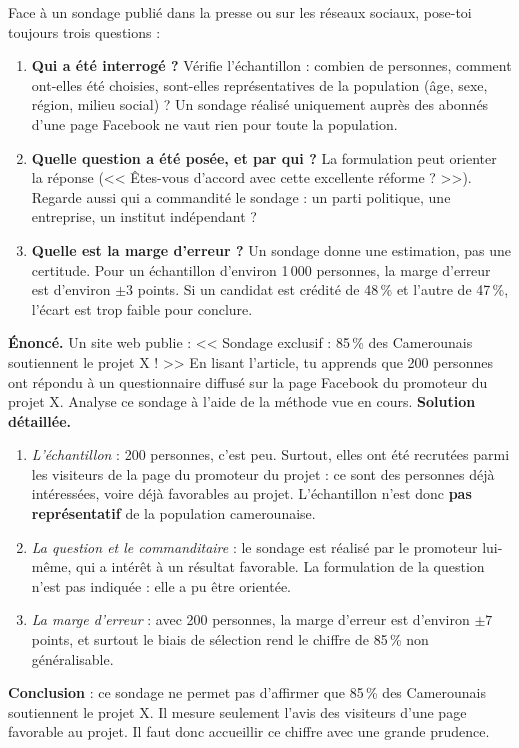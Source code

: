 \documentclass[11pt]{article}
\newcommand{\cle}[1]{{\popxbold\color{popdark}#1}}
\begin{document}
\begin{methode}
Face à un sondage publié dans la presse ou sur les réseaux sociaux, pose-toi toujours trois questions :
\begin{enumerate}
\item \textbf{Qui a été interrogé ?} Vérifie l'\cle{échantillon} : combien de personnes, comment ont-elles été choisies, sont-elles représentatives de la population (âge, sexe, région, milieu social) ? Un sondage réalisé uniquement auprès des abonnés d'une page Facebook ne vaut rien pour toute la population.
\item \textbf{Quelle question a été posée, et par qui ?} La formulation peut orienter la réponse (<< Êtes-vous d'accord avec cette excellente réforme ? >>). Regarde aussi qui a commandité le sondage : un parti politique, une entreprise, un institut indépendant ?
\item \textbf{Quelle est la marge d'erreur ?} Un sondage donne une estimation, pas une certitude. Pour un échantillon d'environ 1\,000 personnes, la marge d'erreur est d'environ $\pm 3$ points. Si un candidat est crédité de 48\,\% et l'autre de 47\,\%, l'écart est trop faible pour conclure.
\end{enumerate}
\end{methode}

\begin{exoresolu}
\textbf{Énoncé.} Un site web publie : << Sondage exclusif : 85\,\% des Camerounais soutiennent le projet X ! >> En lisant l'article, tu apprends que 200 personnes ont répondu à un questionnaire diffusé sur la page Facebook du promoteur du projet X. Analyse ce sondage à l'aide de la méthode vue en cours.
\tcblower
\textbf{Solution détaillée.}
\begin{enumerate}
\item \emph{L'échantillon} : 200 personnes, c'est peu. Surtout, elles ont été recrutées parmi les visiteurs de la page du promoteur du projet : ce sont des personnes déjà intéressées, voire déjà favorables au projet. L'échantillon n'est donc \textbf{pas représentatif} de la population camerounaise.
\item \emph{La question et le commanditaire} : le sondage est réalisé par le promoteur lui-même, qui a intérêt à un résultat favorable. La formulation de la question n'est pas indiquée : elle a pu être orientée.
\item \emph{La marge d'erreur} : avec 200 personnes, la marge d'erreur est d'environ $\pm 7$ points, et surtout le biais de sélection rend le chiffre de 85\,\% non généralisable.
\end{enumerate}
\textbf{Conclusion} : ce sondage ne permet pas d'affirmer que 85\,\% des Camerounais soutiennent le projet X. Il mesure seulement l'avis des visiteurs d'une page favorable au projet. Il faut donc accueillir ce chiffre avec une grande prudence.
\end{exoresolu}
\end{document}
